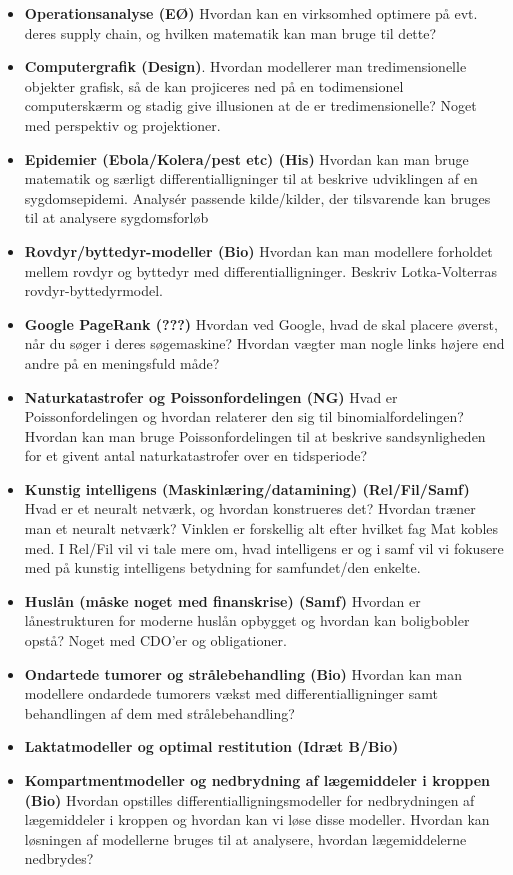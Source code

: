 \documentclass[12pt]{article}
\begin{document}
\begin{itemize}
	\item \textbf{Operationsanalyse (EØ)}
	Hvordan kan en virksomhed optimere på evt. deres supply chain,
	 og hvilken matematik kan man bruge til dette? 
	\item \textbf{Computergrafik (Design)}.
	Hvordan modellerer man tredimensionelle objekter grafisk, så de kan projiceres ned på
	en todimensionel computerskærm og stadig give illusionen at de er tredimensionelle? Noget
	med perspektiv og projektioner.
	\item \textbf{ Epidemier (Ebola/Kolera/pest etc) (His)}
	Hvordan kan man bruge matematik og særligt differentialligninger til at beskrive udviklingen af en sygdomsepidemi. Analysér passende kilde/kilder, der tilsvarende kan bruges 
	til at analysere sygdomsforløb
	\item \textbf{Rovdyr/byttedyr-modeller (Bio)}
	Hvordan kan man modellere forholdet mellem rovdyr og byttedyr med differentialligninger. Beskriv Lotka-Volterras rovdyr-byttedyrmodel. 
	\item \textbf{Google PageRank (???)}
	Hvordan ved Google, hvad de skal placere øverst, når du søger i deres søgemaskine? Hvordan vægter man nogle links højere end andre på en meningsfuld måde?
	\item \textbf{Naturkatastrofer og Poissonfordelingen (NG)}
	Hvad er Poissonfordelingen og hvordan relaterer den sig til binomialfordelingen? Hvordan kan man bruge Poissonfordelingen til at beskrive sandsynligheden for et givent antal 
	naturkatastrofer over en tidsperiode?
	\item \textbf{Kunstig intelligens (Maskinlæring/datamining) (Rel/Fil/Samf)}
	Hvad er et neuralt netværk, og hvordan konstrueres det? Hvordan træner man et neuralt netværk? Vinklen er forskellig alt efter hvilket fag Mat kobles med.
	I Rel/Fil vil vi tale mere om, hvad intelligens er og i samf vil vi fokusere med på kunstig intelligens betydning for samfundet/den enkelte.
	\item \textbf{Huslån (måske noget med finanskrise) (Samf)}
	Hvordan er lånestrukturen for moderne huslån opbygget og hvordan kan boligbobler opstå? Noget med CDO'er og obligationer.
	\item \textbf{Ondartede tumorer og strålebehandling (Bio)}
	Hvordan kan man modellere ondardede tumorers vækst med differentialligninger samt behandlingen af dem med strålebehandling?
	\item \textbf{Laktatmodeller og optimal restitution (Idræt B/Bio)}
	\item \textbf{Kompartmentmodeller og nedbrydning af lægemiddeler i kroppen (Bio)}
	Hvordan opstilles differentialligningsmodeller for nedbrydningen af lægemiddeler i kroppen og hvordan kan vi
	løse disse modeller. Hvordan kan løsningen af modellerne bruges til at analysere, hvordan lægemiddelerne 
	nedbrydes?
\end{itemize}

\newpage
\end{document}
